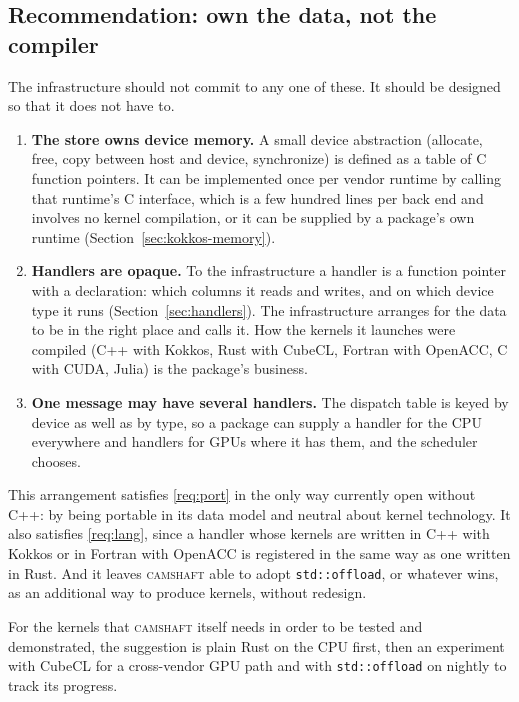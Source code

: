 \documentclass[11pt,a4paper]{article}
\newcommand{\camshaft}{\textsc{camshaft}}
\newcommand{\code}[1]{\texttt{#1}}
\begin{document}
\subsection{Recommendation: own the data, not the compiler}

The infrastructure should not commit to any one of these.  It should be
designed so that it does not have to.

\begin{enumerate}
  \item \textbf{The store owns device memory.}  A small device abstraction
        (allocate, free, copy between host and device, synchronize) is
        defined as a table of C function pointers.  It can be implemented
        once per vendor runtime by calling that runtime's C interface, which
        is a few hundred lines per back end and involves no kernel
        compilation, or it can be supplied by a package's own runtime
        (Section~\ref{sec:kokkos-memory}).
  \item \textbf{Handlers are opaque.}  To the infrastructure a handler is a
        function pointer with a declaration: which columns it reads and
        writes, and on which device type it runs
        (Section~\ref{sec:handlers}).  The infrastructure arranges for the
        data to be in the right place and calls it.  How the kernels it
        launches were compiled (C++ with Kokkos, Rust with CubeCL, Fortran
        with OpenACC, C with CUDA, Julia) is the package's business.
  \item \textbf{One message may have several handlers.}  The dispatch table
        is keyed by device as well as by type, so a package can supply a
        handler for the CPU everywhere and handlers for GPUs where it has
        them, and the scheduler chooses.
\end{enumerate}

This arrangement satisfies \ref{req:port} in the only way currently open
without C++: by being portable in its data model and neutral about kernel
technology.  It also satisfies \ref{req:lang}, since a handler whose kernels
are written in C++ with Kokkos or in Fortran with OpenACC is registered in the
same way as one written in Rust.  And
it leaves \camshaft{} able to adopt \code{std::offload}, or whatever wins, as an
additional way to produce kernels, without redesign.

For the kernels that \camshaft{} itself needs in order to be tested and
demonstrated, the suggestion is plain Rust on the CPU first, then an
experiment with CubeCL for a cross-vendor GPU path and with
\code{std::offload} on nightly to track its progress.
\end{document}
